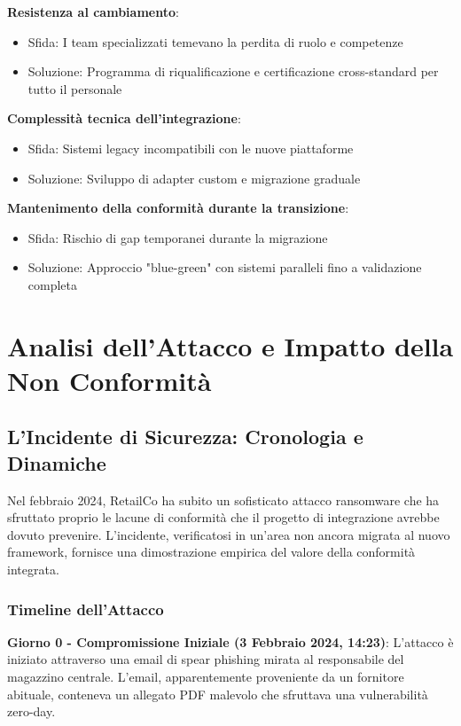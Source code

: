 \textbf{Resistenza al cambiamento}: 
\begin{itemize}
    \item Sfida: I team specializzati temevano la perdita di ruolo e competenze
    \item Soluzione: Programma di riqualificazione e certificazione cross-standard per tutto il personale
\end{itemize}

\textbf{Complessità tecnica dell'integrazione}:
\begin{itemize}
    \item Sfida: Sistemi legacy incompatibili con le nuove piattaforme
    \item Soluzione: Sviluppo di adapter custom e migrazione graduale
\end{itemize}

\textbf{Mantenimento della conformità durante la transizione}:
\begin{itemize}
    \item Sfida: Rischio di gap temporanei durante la migrazione
    \item Soluzione: Approccio "blue-green" con sistemi paralleli fino a validazione completa
\end{itemize}

\section{Analisi dell'Attacco e Impatto della Non Conformità}
\label{sec:4.8_analisi_attacco}

\subsection{L'Incidente di Sicurezza: Cronologia e Dinamiche}
\label{subsec:4.8.1_incidente}

Nel febbraio 2024, RetailCo ha subito un sofisticato attacco ransomware che ha sfruttato proprio le lacune di conformità che il progetto di integrazione avrebbe dovuto prevenire. L'incidente, verificatosi in un'area non ancora migrata al nuovo framework, fornisce una dimostrazione empirica del valore della conformità integrata.

\subsubsection{Timeline dell'Attacco}

\textbf{Giorno 0 - Compromissione Iniziale (3 Febbraio 2024, 14:23)}:
L'attacco è iniziato attraverso una email di spear phishing mirata al responsabile del magazzino centrale. L'email, apparentemente proveniente da un fornitore abituale, conteneva un allegato PDF malevolo che sfruttava una vulnerabilità zero-day.

